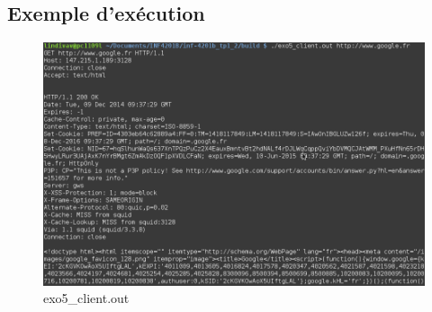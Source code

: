 \subsection{Exemple d'exécution}
\begin{figure}[h!]
	\centering
	\includegraphics[width=1.0\textwidth]{screenshots/ex5.png}
	\caption{exo5\_client.out}
\end{figure}

